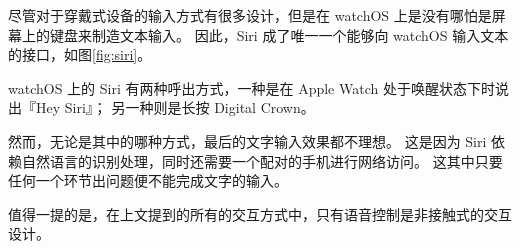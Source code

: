 尽管对于穿戴式设备的输入方式有很多设计，但是在 watchOS 上是没有哪怕是屏幕上的键盘来制造文本输入。
因此，Siri 成了唯一一个能够向 watchOS 输入文本的接口，如图\ref{fig:siri}。

watchOS 上的 Siri 有两种呼出方式，一种是在 Apple Watch 处于唤醒状态下时说出『Hey Siri』；
另一种则是长按 Digital Crown。

然而，无论是其中的哪种方式，最后的文字输入效果都不理想。
这是因为 Siri 依赖自然语言的识别处理，同时还需要一个配对的手机进行网络访问。
这其中只要任何一个环节出问题便不能完成文字的输入。

值得一提的是，在上文提到的所有的交互方式中，只有语音控制是非接触式的交互设计。
